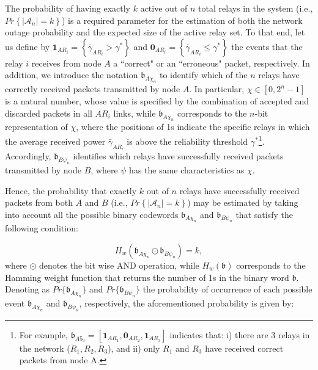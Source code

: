 \documentclass[12pt,draftcls, onecolumn]{IEEEtran}
\begin{document}
The probability of having exactly $k$ active out of $n$ total relays in the system (i.e., $Pr\left\{\left|\mathcal{A}_n\right|=k\right\}$) is a required parameter for the estimation of both the network outage probability and the expected size of the active relay set. To that end, let us define by $\boldsymbol{1}_{AR_i} = \left\{\bar{\gamma}_{{AR_i}}>\gamma^*\right\}$ and $\boldsymbol{0}_{AR_i} = \left\{\bar{\gamma}_{{AR_i}}\leq\gamma^*\right\}$ the events that the relay $i$ receives from node $A$ a ``correct" or an ``erroneous" packet, respectively. In addition, we introduce the notation $\mathfrak{b}_{A\chi_n}$ to identify which of the $n$ relays have correctly received packets transmitted by node $A$. In particular, $\chi\in [0,2^n-1]$ is a natural number, whose value is specified by the combination of accepted and discarded packets in all $AR_i$ links, while $\mathfrak{b}_{A\chi_n}$ corresponds to the $n$-bit representation of $\chi$, where the positions of 1s indicate the specific relays in which the average received power $\bar{\gamma}_{AR_i}$ is above the reliability threshold $\gamma^*$\footnote{For example, $\mathfrak{b}_{A5_3}=[\boldsymbol{1}_{AR_1},\boldsymbol{0}_{AR_2},\boldsymbol{1}_{AR_3}]$ indicates that: i) there are 3 relays in the network ($R_1,R_2,R_3$), and ii) only $R_1$ and $R_3$ have received correct packets from node A.}. Accordingly, $\mathfrak{b}_{B\psi_n}$ identifies which relays have successfully received packets transmitted by node $B$, where $\psi$ has the same characteristics as $\chi$.

Hence, the probability that exactly $k$ out of $n$ relays have successfully received packets from both $A$ and $B$ (i.e., $Pr\left\{\left|\mathcal{A}_n\right|=k\right\}$) may be estimated by taking into account all the possible binary codewords $\mathfrak{b}_{A\chi_n}$ and $\mathfrak{b}_{B\psi_n}$ that satisfy the following condition:

\begin{equation}
H_w\left(\mathfrak{b}_{A\chi_n}\odot \mathfrak{b}_{B\psi_n}\right)=k,
\end{equation}
where $\odot$ denotes the bit wise AND operation, while $H_w\left(\mathfrak{b}\right)$ corresponds to the Hamming weight function that returns the number of 1s in the binary word $\mathfrak{b}$. Denoting as $Pr\{\mathfrak{b}_{A\chi_n}\}$ and $Pr\{\mathfrak{b}_{B\psi_n}\}$ the probability of occurrence of each possible event $\mathfrak{b}_{A\chi_n}$ and $\mathfrak{b}_{B\psi_n}$, respectively, the aforementioned probability is given by:
\end{document}
